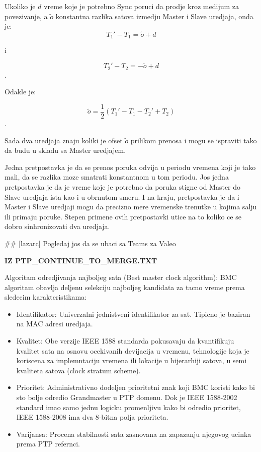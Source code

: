 \documentclass[a4paper,12pt, master]{etf}
\begin{document}
	Ukoliko je $d$ vreme koje je potrebno Sync poruci da prodje kroz medijum za povezivanje, a 
	$\tilde{o}$	konstantna razlika satova izmedju Master i Slave uredjaja, onda je:
	\begin{equation}
		T_1' - T_1 = \tilde{o} + d
	\end{equation}

	i

	\begin{equation}
			T_2' - T_2 = -\tilde{o} + d
	\end{equation}.

	Odakle je:

	\begin{equation}
		\tilde{o}=\frac{1}{2}(T_1' - T_1 - T_2' + T_2)
	\end{equation}.

	Sada dva uredjaja znaju koliki je ofset $\tilde{o}$ prilikom prenosa i mogu se ispraviti 
	tako da budu u skladu sa Master uredjajem.

	Jedna pretpostavka je da se prenos poruka odvija u periodu vremena koji je tako mali, da se
	razlika moze smatrati konstantnom u tom periodu. Jos jedna pretpostavka je da je vreme 
	koje je	potrebno da poruka stigne od Master do Slave uredjaja ista kao i u obrnutom smeru. 
	I na kraju,	pretpostavka je da i Master i Slave uredjaji mogu da precizno mere vremenske 
	trenutke u kojima salju ili primaju poruke. Stepen primene ovih pretpostavki utice na to 
	koliko ce se dobro sinhronizovati dva uredjaja.

	\#\# [lazarc] Pogledaj jos da se ubaci sa Teams za Valeo

	\textbf{IZ PTP\_CONTINUE\_TO\_MERGE.TXT}

	Algoritam odredjivanja najboljeg sata (Best master clock algorithm):
	BMC algoritam obavlja deljenu selekciju najboljeg kandidata za tacno vreme prema sledecim 
	karakteristikama:

	\begin{itemize}
		\item Identifikator: Univerzalni jednistveni identifikator za sat. Tipicno je baziran na 
		MAC adresi uredjaja.
		\item Kvalitet: Obe verzije IEEE 1588 standarda pokusavaju da kvantifikuju kvalitet sata 
		na osnovu ocekivanih devijacija u vremenu, tehnologije koja je koriscena za 
		implemntaciju vremena ili lokacije u hijerarhiji satova, u semi kvaliteta satova (clock 
		stratum scheme).
		\item Prioritet: Administrativno dodeljen prioritetni znak koji BMC koristi kako bi sto 
		bolje odredio Grandmaster u PTP domenu. Dok je IEEE 1588-2002 standard imao samo jednu 
		logicku promenljivu kako bi odredio prioritet, IEEE 1588-2008 ima dva 8-bitna polja 
		prioriteta.
		\item Varijansa: Procena stabilnosti sata zasnovana na zapazanju njegovog ucinka prema 
		PTP refernci.
	\end{itemize}
\end{document}
